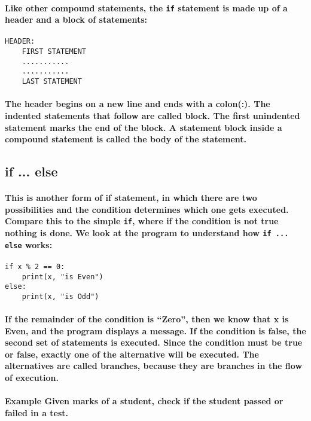 \documentclass{book}
\begin{document}
\paragraph{Like other compound statements, the \texttt{if} statement is made up of a header and a block of statements:}

\begin{verbatim}
HEADER:
    FIRST STATEMENT
    ...........
    ...........
    LAST STATEMENT
\end{verbatim}

\paragraph{The header begins on a new line and ends with a colon(:). The indented statements that follow are called block. The first unindented statement marks the end of the block. A statement block inside a compound statement is called the body of the statement.}

\subsection *{if ... else}
\paragraph{This is another form of if statement, in which there are two possibilities and the condition determines
which one gets executed. Compare this to the simple \texttt{if}, where if the condition is not true nothing is
done. We look at the program to understand how \texttt{if ... else} works:}
\begin{verbatim}
if x % 2 == 0:
    print(x, "is Even")
else:
    print(x, "is Odd")
\end{verbatim}

\paragraph{If the remainder of the condition is “Zero”, then we know that x is Even, and the program displays
a message. If the condition is false, the second set of statements is executed. Since the condition must be true or false, exactly one of the alternative will be executed. The alternatives are called branches, because they are branches in the flow of execution.}

\paragraph{\textbf{Example} Given marks of a student, check if the student passed or failed in a test.}
\end{document}
